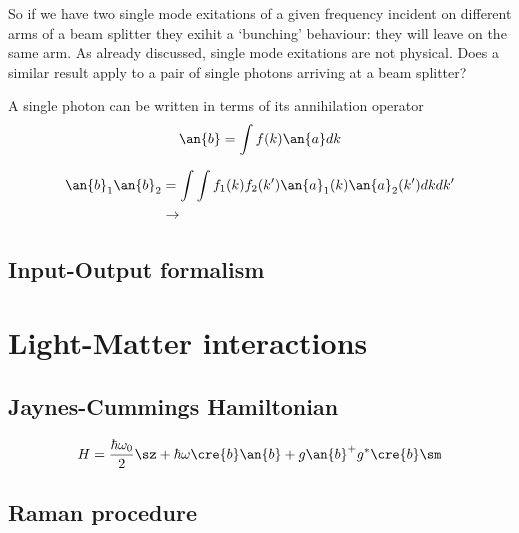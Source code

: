 So if we have two single mode exitations of a given frequency incident on different arms of a beam splitter they exihit a `bunching' behaviour: they will leave on the same arm. As already discussed, single mode exitations are not physical. Does a similar result apply to a pair of single photons arriving at a beam splitter?

A single photon can be written in terms of its annihilation operator
\begin{align}
  \an{b} = \int f(k) \an{a} dk
\end{align}

\begin{align}
  \an{b}_1 \an{b}_2 & = \int \int f_1(k)f_2(k') \an{a}_1(k) \an{a}_2(k') dkdk' \\
                    & \rightarrow
\end{align}

\subsection{Input-Output formalism}



\section{Light-Matter interactions}

\subsection{Jaynes-Cummings Hamiltonian}

\begin{align}
  H = \frac{\hbar \omega_0}{2} \sz + \hbar \omega \cre{b}\an{b} + g\an{b} \sp + g^{*}\cre{b} \sm
\end{align}

\subsection{Raman procedure}




